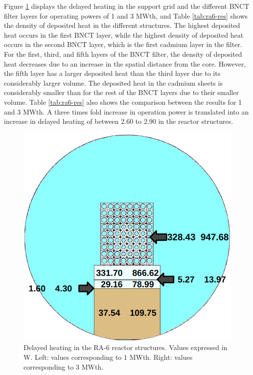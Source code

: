 \documentclass{style/nseJournal}
\begin{document}
Figure \ref{fig:ra6-3} displays the delayed heating in the support grid and the different BNCT filter layers for operating powers of 1 and 3 MWth, and Table \ref{tab:ra6-res} shows the density of deposited heat in the different structures.
The highest deposited heat occurs in the first BNCT layer, while the highest density of deposited heat occurs in the second BNCT layer, which is the first cadmium layer in the filter.
For the first, third, and fifth layers of the BNCT filter, the density of deposited heat decreases due to an increase in the spatial distance from the core.
However, the fifth layer has a larger deposited heat than the third layer due to its considerably larger volume.
The deposited heat in the cadmium sheets is considerably smaller than for the rest of the BNCT layers due to their smaller volume.
Table \ref{tab:ra6-res} also shows the comparison between the results for 1 and 3 MWth.
A three times fold increase in operation power is translated into an increase in delayed heating of between 2.60 to 2.90 in the reactor structures.

\begin{figure}[htbp!] %
    \centering
    \includegraphics[width=0.80\linewidth]{figures/results_b}
    \hfill
    \caption{Delayed heating in the RA-6 reactor structures. Values expressed in W. Left: values corresponding to 1 MWth. Right: values corresponding to 3 MWth.}
    \label{fig:ra6-3}
\end{figure}
\end{document}
